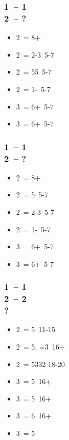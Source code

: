 \subsubsection*{1\hearts\ -- 1\ntx\ \\ 2\clubs\ -- ?}
\begin{itemize}
    \item 2\diams\ = 8+
    \item 2\hearts\ = 2-3\hearts\ 5-7
    \item 2\spades\ = 55\minor\ 5-7
    \item 2\nt\ = 1-\hearts\ 5-7
    \item 3\clubs\ = 6+\clubs\ 5-7
    \item 3\diams\ = 6+\diams\ 5-7
\end{itemize}

\subsubsection*{1\spades\ -- 1\ntx\ \\ 2\clubs\ -- ?}
\begin{itemize}
    \item 2\diams\ = 8+
    \item 2\hearts\ = 5\hearts\ 5-7
    \item 2\spades\ = 2-3\spades\ 5-7
    \item 2\ntx\ = 1-\spades\ 5-7
    \item 3\clubs\ = 6+\clubs\ 5-7
    \item 3\diams\ = 6+\diams\ 5-7
\end{itemize}

\subsubsection*{1\hearts\ -- 1\spades\ \\ 2\clubs\ -- 2\diams \\ ?}
\begin{itemize}
    \item 2\hearts\ = 5\clubs\ 11-15
    \item 2\spades\ = 5\hearts, =3\spades\ 16+
    \item 2\ntx\ = 5332 18-20
    \item 3\clubs\ = 5\clubs\ 16+
    \item 3\diams\ = 5\diams\ 16+
    \item 3\hearts\ = 6\hearts\ 16+
    \item 3\spades\ = 5\spades\ \gf
\end{itemize}

